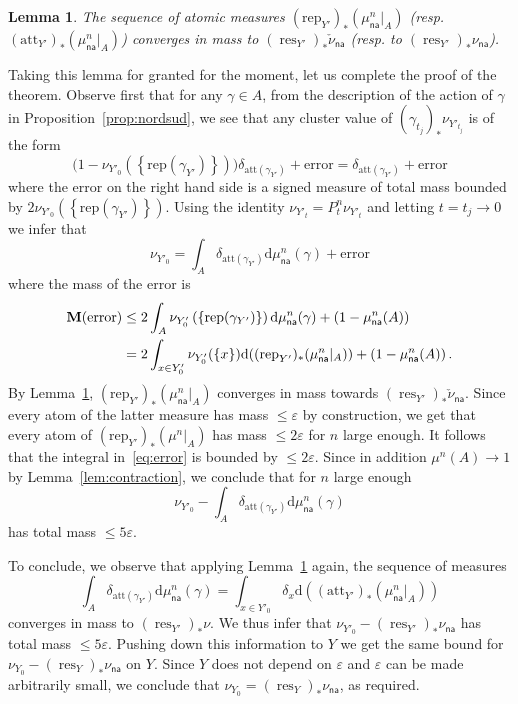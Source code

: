 \documentclass[10pt]{amsart}
\newtheorem{lemm}[theo]{Lemma}\newtheorem{prop}[theo]{Proposition}\newtheorem{coro}[theo]{Corollary}\newtheorem{conj}[theo]{Conjecture}
\theoremstyle{definition}\newtheorem{defi}[theo]{Definition}\newtheorem{rema}[theo]{Remark}\newtheorem{exam}[theo]{Example}\newtheorem{exem}[theo]{Example}\newtheorem{nota}[theo]{Notation}
\DeclareMathOperator{\res}{res}
\newcommand{\Rep}{\mathrm{rep}}
\newcommand{\Att}{\mathrm{att}}
\newcommand{\e}{\varepsilon}
\newcommand{\cv}{\rightarrow}
\newcommand{\set}[1]{\left\{#1\right\}}
\newcommand{\m}{\textbf{M}}
\newcommand{\lrpar}[1]{\left(#1\right)}
\newcommand{\att}{\mathrm{att}}
\newcommand{\rep}{\mathrm{rep}}
\newcommand{\na}{\mathsf{na}}
\newcommand*{\dd}{\mathrm{d}}
\newcommand*{\dmu}{\dd \mu}
\begin{document}
\begin{lemm}\label{lem:distrib rep-att}
The sequence of atomic measures $(\Rep_{Y'})_*(\mu^n_\na|_{A}) $ (resp.\linebreak $(\Att_{Y'})_*(\mu^n_\na|_{A}) $) converges in mass to $(\res_{Y'})_*\check\nu_\na$ (resp. to $(\res_{Y'})_*\nu_\na$).
\end{lemm}

Taking this lemma for granted for the moment, let us complete the proof of the theorem. Observe first that for any $\gamma \in A$, from the description of the action of $\gamma$ in Proposition~\ref{prop:nordsud}, we see that any cluster value of $(\gamma_{t_j})_*\nu_{Y'_{t_j}}$ is of the form
\[
\big(1- \nu_{Y'_0}\lrpar{\set{\rep(\gamma_{Y'})}}\big) \delta_{\att(\gamma_{Y'})} + \mathrm{error}
=
\delta_{\att(\gamma_{Y'})} + \mathrm{error}
\]
where the error on the right hand side is a signed measure of total mass bounded by $ 2 \nu_{Y'_0}\lrpar{\set{\rep(\gamma_{Y'})}}$. Using the identity $\nu_{Y'_t} = P_t^n\nu_{Y'_t}$ and letting $t=t_j\cv0$ we infer that
\begin{equation}\label{eq:limit stationary}
\nu_{Y'_0} = \int_{A} \delta_{\att(\gamma_{Y'})} \dmu_\na^n(\gamma) + \mathrm{error}
\end{equation}
where the mass of the error is
\begin{align}
\notag \m(\mathrm{error}) & \leq 2 \int_{A} \nu_{Y'_0}\lrpar{\set{\rep(\gamma_{Y'})}} \dmu_\na^n(\gamma) +
\lrpar{1 -\mu_\na^n(A)} \\\label{eq:error}
&= 2 \int_{x\in Y'_0} \nu_{Y'_0}(\{ x \}) \dd \!\left((\Rep_{Y'})_*(\mu_\na^n|_{A})\right)+ \lrpar{1 -\mu_\na^n(A)}.
\end{align}
By Lemma~\ref{lem:distrib rep-att}, $(\Rep_{Y'})_*(\mu_\na^n|_{A})$ converges in mass towards $(\res_{Y'})_*\check\nu_\na$. Since every atom of the latter measure has mass $\le \varepsilon$ by construction, we get that every atom of $(\Rep_{Y'})_*(\mu^n|_{A})$ has mass $\le 2\varepsilon$ for $n$ large enough. It follows that the integral in~\eqref{eq:error} is bounded by $\le 2 \varepsilon$. Since in addition $\mu^n(A) \to 1$ by Lemma~\ref{lem:contraction}, we conclude that for $n$ large enough
\begin{equation}
\nu_{Y'_0} - \int_{A} \delta_{\att(\gamma_{Y'})} \dmu_\na^n(\gamma)
\end{equation}
has total mass $\le 5 \varepsilon$.

To conclude, we observe that applying Lemma~\ref{lem:distrib rep-att} again, the sequence of measures
\[
\int_{A} \delta_{\att(\gamma_{Y'})} \dmu_\na^n(\gamma) = \int_{x\in Y'_0} \delta_x \dd\!\left((\Att_{Y'})_*(\mu_\na^n|_{A})\right)
\]
converges in mass to $(\res_{Y'})_*\nu$. We thus infer that $ \nu_{Y'_0} - (\res_{Y'})_*\nu_\na$ has total mass $\le 5 \varepsilon$. Pushing down this information to $Y$ we get the same bound for $\nu_{Y_0} - (\res_{Y})_*\nu_\na$ on $Y$. Since $Y$ does not depend on $\e$ and $\e$ can be made arbitrarily small, we conclude that $\nu_{Y_0} = (\res_{Y})_*\nu_\na$, as required.
\end{document}
